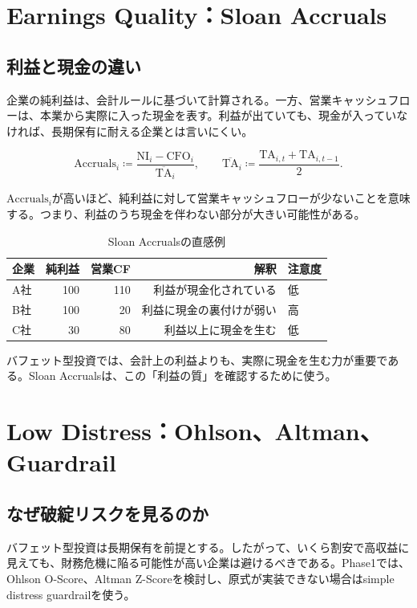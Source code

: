 \documentclass[11pt,a4paper]{article}
\newcommand{\NI}{\mathrm{NI}}
\newcommand{\TA}{\mathrm{TA}}
\newcommand{\CFO}{\mathrm{CFO}}
\newcommand{\Acc}{\mathrm{Accruals}}
\begin{document}
\clearpage
\section{Earnings Quality：Sloan Accruals}

\subsection{利益と現金の違い}

企業の純利益は、会計ルールに基づいて計算される。一方、営業キャッシュフローは、本業から実際に入った現金を表す。利益が出ていても、現金が入っていなければ、長期保有に耐える企業とは言いにくい。

\begin{equation}
\Acc_i \coloneqq \frac{\NI_i - \CFO_i}{\overline{\TA}_i},
\qquad
\overline{\TA}_i \coloneqq \frac{\TA_{i,t}+\TA_{i,t-1}}{2}.
\label{eq:sloan}
\end{equation}

$\Acc_i$が高いほど、純利益に対して営業キャッシュフローが少ないことを意味する。つまり、利益のうち現金を伴わない部分が大きい可能性がある。

\begin{table}[tbp]
\caption{Sloan Accrualsの直感例}
\label{tab:sloan-example}
\centering
\small
\begin{tabular}{lrrrl}
\toprule
企業 & 純利益 & 営業CF & 解釈 & 注意度 \\
\midrule
A社 & 100 & 110 & 利益が現金化されている & 低 \\
B社 & 100 & 20 & 利益に現金の裏付けが弱い & 高 \\
C社 & 30 & 80 & 利益以上に現金を生む & 低 \\
\bottomrule
\end{tabular}
\end{table}

バフェット型投資では、会計上の利益よりも、実際に現金を生む力が重要である。Sloan Accrualsは、この「利益の質」を確認するために使う。

\clearpage
\section{Low Distress：Ohlson、Altman、Guardrail}

\subsection{なぜ破綻リスクを見るのか}

バフェット型投資は長期保有を前提とする。したがって、いくら割安で高収益に見えても、財務危機に陥る可能性が高い企業は避けるべきである。Phase1では、Ohlson O-Score、Altman Z-Scoreを検討し、原式が実装できない場合はsimple distress guardrailを使う。
\end{document}
